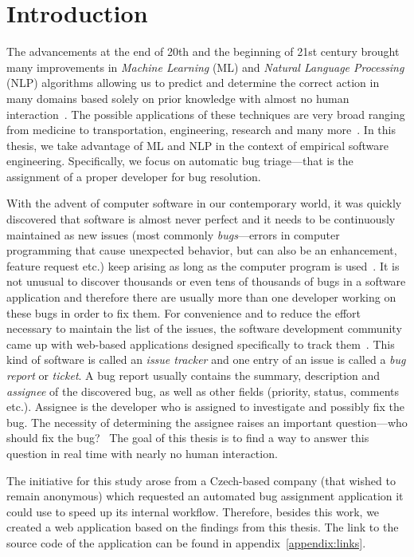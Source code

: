 \chapter{Introduction}

The advancements at the end of 20th and the beginning of 21st century brought many improvements in \textit{Machine Learning} (ML) and \textit{Natural Language Processing} (NLP) algorithms allowing us to predict and determine the correct action in many domains based solely on prior knowledge with almost no human interaction~\cite{carbonell1983overview}. The possible applications of these techniques are very broad ranging from medicine to transportation, engineering, research and many more~\cite{kononenko2001machine}\cite{nguyen1990neural}. In this thesis, we take advantage of ML and NLP in the context of empirical software engineering. Specifically, we focus on automatic bug triage---that is the assignment of a proper developer for bug resolution.

With the advent of computer software in our contemporary world, it was quickly discovered that software is almost never perfect and it needs to be continuously maintained as new issues (most commonly \textit{bugs}---errors in computer programming that cause unexpected behavior, but can also be an enhancement, feature request etc.) keep arising as long as the computer program is used~\cite{nist2002}. It is not unusual to discover thousands or even tens of thousands of bugs in a software application and therefore there are usually more than one developer working on these bugs in order to fix them. For convenience and to reduce the effort necessary to maintain the list of the issues, the software development community came up with web-based applications designed specifically to track them~\cite{bertram2010communication}. This kind of software is called an \textit{issue tracker} and one entry of an issue is called a \textit{bug report} or \textit{ticket}. A bug report usually contains the summary, description and \textit{assignee} of the discovered bug, as well as other fields (priority, status, comments etc.). Assignee is the developer who is assigned to investigate and possibly fix the bug. The necessity of determining the assignee raises an important question---who should fix the bug?~\cite{Anvik2006} The goal of this thesis is to find a way to answer this question in real time with nearly no human interaction.

The initiative for this study arose from a Czech-based company (that wished to remain anonymous) which requested an automated bug assignment application it could use to speed up its internal workflow. Therefore, besides this work, we created a web application based on the findings from this thesis. The link to the source code of the application can be found in appendix~\ref{appendix:links}.


